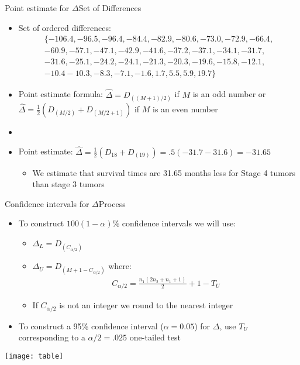 \documentclass[xcolor=dvipsnames]{beamer}
\begin{document}
\begin{frame}{Point estimate for $\Delta$}{Set of Differences}
	\begin{itemize}
		\item Set of ordered differences: \pause
		\begin{gather*}
			\{-106.4,  -96.5,  -96.4,  -84.4,  -82.9,  -80.6,  -73.0,  -72.9,  -66.4,\\ -60.9,  -57.1,  -47.1,  -42.9, -41.6,  -37.2,  -37.1,  -34.1, 
			-31.7, \\ -31.6,  -25.1,  -24.2,  -24.1,  -21.3,  -20.3,  -19.6,  -15.8,  -12.1, \\ -10.4   -10.3,   -8.3,   -7.1,   -1.6,    1.7,    5.5, 5.9,   19.7\}
		\end{gather*} \pause
		\item Point estimate formula: $\hat{\Delta} = D_{((M+1)/2)}$ if $M$ is an odd number or $\hat{\Delta} = \frac{1}{2} (D_{(M/2)} + D_{(M/2+1)})$ if $M$ is an even number \pause
		\item[]
		\item Point estimate: $\hat{\Delta} = \frac{1}{2} (D_{18} + D_{(19)}) = .5(-31.7 - 31.6) = -31.65$
		\begin{itemize}
			\item We estimate that survival times are 31.65 months less for Stage 4 tumors than stage 3 tumors
		\end{itemize}
	\end{itemize}
\end{frame}

\begin{frame}{Confidence intervals for $\Delta$}{Process}
\begin{itemize}
	\item To construct $100(1-\alpha) \%$ confidence intervals we will use: \pause
	\begin{itemize}
		\item $\Delta_L = D_{(C_{\alpha / 2})}$ \pause
		\item $\Delta_U = D_{(M + 1 - C_{\alpha / 2})}$ \pause
		where:
		\begin{gather*}
		C_{\alpha / 2} = \frac{n_1 (2n_2 + n_1 + 1)}{2} + 1 - T_U
		\end{gather*}
				\item If $C_{\alpha / 2}$ is not an integer we round to the nearest integer \pause
	\end{itemize}
	\item To construct a 95\% confidence interval ($\alpha = 0.05$) for $\Delta$, use $T_U$ corresponding to a $\alpha /2 = .025$ one-tailed test
\end{itemize}
\begin{center}
	\texttt{[image: table]}
\end{center}
\end{frame}
\end{document}
